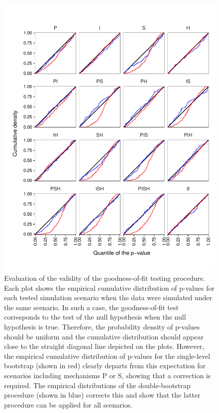 \documentclass[a4paper]{article}\usepackage[]{graphicx}\usepackage[]{color}
\begin{document}
\begin{figure}[H]
\begin{center}
\includegraphics[width = 0.9\linewidth]{../figures/figS7.pdf}
\end{center}
\caption{Evaluation of the validity of the goodness-of-fit testing procedure. Each plot shows the empirical cumulative distribution of p-values for each tested simulation scenario when the data were simulated under the same scenario. In such a case, the goodness-of-fit test corresponds to the test of the null hypothesis when the null hypothesis is true. Therefore, the probability density of p-values should be uniform and the cumulative distribution should appear close to the straight diagonal line depicted on the plots. However, the empirical cumulative distribution of p-values for the single-level bootstrap (shown in red) clearly departs from this expectation for scenarios including mechanisms P or S, showing that a correction is required. The empirical distributions of the double-bootstrap procedure (shown in blue) corrects this and show that the latter procedure can be applied for all scenarios.}
\end{figure}
\end{document}
